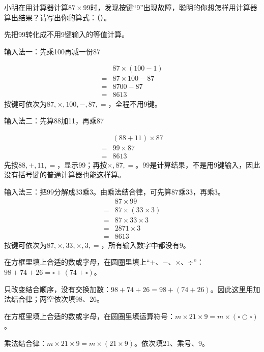 小明在用计算器计算\(87\times99\)时，发现按键“9”出现故障，聪明的你想怎样用计算器算出结果？请写出你的算式：（\hspace{1.8em}）。\par
\begin{BookAnswer}
先把99转化成不用9键输入的等值计算。\par 输入法一：先乘100再减一份87\par \[\begin{aligned} &87\times(100-1)\\={}&87\times100-87\\={}&8700-87\\={}&8613\end{aligned}\]按键可依次为\(87,\times,100,-,87,=\)，全程不用9键。\par 输入法二：先算88加11，再乘87\par \[\begin{aligned} &(88+11)\times87\\={}&99\times87\\={}&8613\end{aligned}\]先按\(88,+,11,=\)，显示99；再按\(\times,87,=\)。99是计算结果，不是用9键输入，因此没有括号键的普通计算器也能这样算。\par 输入法三：把99分解成33乘3。由乘法结合律，可先算87乘33，再乘3。\[\begin{aligned} &87\times99\\={}&87\times(33\times3)\\={}&87\times33\times3\\={}&2871\times3\\={}&8613\end{aligned}\]按键可依次为\(87,\times,33,\times,3,=\)，所有输入数字中都没有9。
\end{BookAnswer}

在方框里填上合适的数或字母，在圆圈里填上“\(+\)、\(-\)、\(\times\)、\(\div\)”：\(98+74+26=\square+(74+\square)\)。\par
\begin{BookAnswer}
只改变结合顺序，没有交换加数：\(98+74+26=98+(74+26)\)。因此这里用加法结合律；两空依次填98、26。
\end{BookAnswer}

在方框里填上合适的数或字母，在圆圈里填运算符号：\(m\times21\times9=m\times(\square\bigcirc\square)\)。\par
\begin{BookAnswer}
乘法结合律：\(m\times21\times9=m\times(21\times9)\)。依次填21、乘号、9。
\end{BookAnswer}

